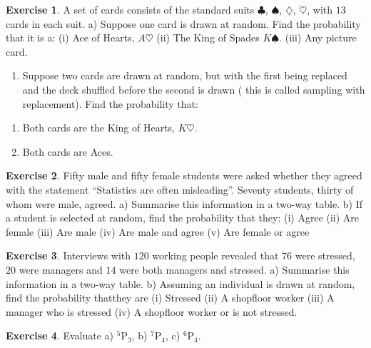 \documentclass[
]{book}
\providecommand{\tightlist}{%
  \setlength{\itemsep}{0pt}\setlength{\parskip}{0pt}}
\theoremstyle{definition}
\theoremstyle{definition}
\theoremstyle{definition}
\newtheorem{exercise}{Exercise}[chapter]
\theoremstyle{definition}
\theoremstyle{remark}
\begin{document}
\begin{exercise}

A set of cards consists of the standard suits \(\clubsuit\), \(\spadesuit\), \(\diamondsuit\), \(\heartsuit\), with \(13\) cards in each suit.
a) Suppose one card is drawn at random. Find the probability that it is a:
(i) Ace of Hearts, \(A\heartsuit\)
(ii) The King of Spades \(K\spadesuit\).
(iii) Any picture card.

\begin{enumerate}
\def\labelenumi{\alph{enumi})}
\setcounter{enumi}{1}
\tightlist
\item
  Suppose two cards are drawn at random, but with the first being replaced and the deck shuffled before the second is drawn ( this is called sampling with replacement). Find the probability that:
\end{enumerate}

\begin{enumerate}
\def\labelenumi{(\roman{enumi})}
\tightlist
\item
  Both cards are the King of Hearts, \(K\heartsuit\).
\item
  Both cards are Aces.
\end{enumerate}

\end{exercise}

\begin{exercise}
Fifty male and fifty female students were asked whether they agreed with the statement ``Statistics are often misleading''. Seventy students, thirty of whom were male, agreed.
a) Summarise this information in a two-way table.
b) If a student is selected at random, find the probability that they:
(i) Agree
(ii) Are female
(iii) Are male
(iv) Are male and agree
(v) Are female or agree
\end{exercise}

\begin{exercise}
Interviews with \(120\) working people revealed that \(76\) were stressed, \(20\) were managers and \(14\) were both managers and stressed.
a) Summarise this information in a two-way table.
b) Assuming an individual is drawn at random, find the probability thatthey are
(i) Stressed
(ii) A shopfloor worker
(iii) A manager who is stressed
(iv) A shopfloor worker or is not stressed.
\end{exercise}

\begin{exercise}
Evaluate a) \(^5\text{P}_3\), b) \(^7\text{P}_4\), c) \(^6\text{P}_4\).
\end{exercise}
\end{document}
